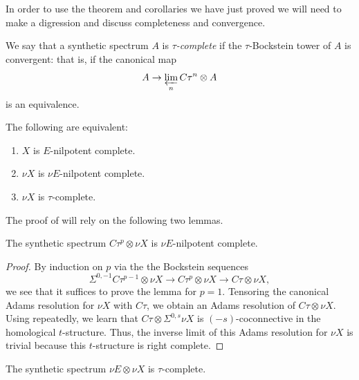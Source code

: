 In order to use the theorem and corollaries we have just proved we will need to make a digression and discuss completeness and convergence.

\begin{dfn}
  We say that a synthetic spectrum $A$ is \emph{$\tau$-complete} if the $\tau$-Bockstein tower of $A$ is convergent: that is, if the canonical map
  \[A \to \varprojlim_n C\tau^n \otimes A\] is an equivalence.
\end{dfn}

\begin{prop} \label{lemm:Elocal-taucomplete} \label{lemm:easy-e-compton}
  The following are equivalent:
  \begin{enumerate}
  \item $X$ is $E$-nilpotent complete.
  \item $\nu X$ is $\nu E$-nilpotent complete.
  \item $\nu X$ is $\tau$-complete.
  \end{enumerate}
\end{prop}

The proof of  will rely on the following two lemmas.

\begin{lem} \label{lemm:comp1}
  The synthetic spectrum $C\tau^p \otimes \nu X$ is $\nu E$-nilpotent complete.
\end{lem}

\begin{proof}
    By induction on $p$ via the the Bockstein sequences
    \[\Sigma^{0,-1} C\tau^{p-1} \otimes \nu X \to C \tau^p \otimes \nu X \to C \tau \otimes \nu X,\]
  we see that it suffices to prove the lemma for $p=1$.
  Tensoring the canonical Adams resolution for $\nu X$ with $C\tau$, we obtain an Adams resolution of $C\tau \otimes \nu X$.
  Using \cite[Lemma 4.29]{Pstragowski} repeatedly, we learn that $C\tau \otimes \Sigma^{0,s}\nu X$ is $(-s)$-coconnective in the homological $t$-structure. Thus, the inverse limit of this Adams resolution for $\nu X$ is trivial because this $t$-structure is right complete.
\end{proof}

\begin{lem} \label{lemm:comp2}
  The synthetic spectrum $\nu E \otimes \nu X$ is $\tau$-complete.
\end{lem}

